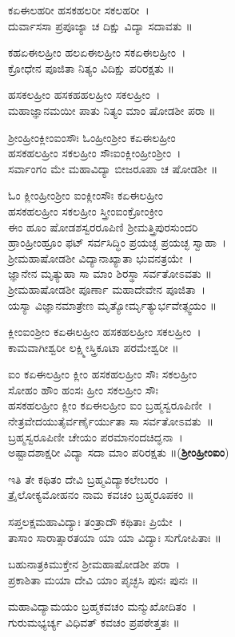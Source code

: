 ಕಏಈಲಹರೀ ಹಸಕಹಲರೀ ಸಕಲಹರೀ~।\\
ದುರ್ವಾಸಸಾ ಪ್ರಪೂಜ್ಯಾ ಚ ದಿಕ್ಷು ವಿದ್ಯಾ ಸದಾವತು ॥

ಕಹಏಈಲಹ್ರೀಂ ಹಲಏಈಲಹ್ರೀಂ ಸಕಏಈಲಹ್ರೀಂ~।\\
ಕ್ರೋಧೇನ ಪೂಜಿತಾ ನಿತ್ಯಂ ವಿದಿಕ್ಷು ಪರಿರಕ್ಷತು ॥

ಹಸಕಲಹ್ರೀಂ ಹಸಕಹಹಲಹ್ರೀಂ ಸಕಲಹ್ರೀಂ~।\\
ಮಹಾಜ್ಞಾನಮಯೀ ಪಾತು ನಿತ್ಯಂ ಮಾಂ ಷೋಡಶೀ ಪರಾ ॥

ಶ್ರೀಂಹ್ರೀಂಕ್ಲೀಂಐಂಸೌಃ ಓಂಹ್ರೀಂಶ್ರೀಂ ಕಏಈಲಹ್ರೀಂ\\ ಹಸಕಹಲಹ್ರೀಂ ಸಕಲಹ್ರೀಂ ಸೌಃಐಂಕ್ಲೀಂಹ್ರೀಂಶ್ರೀಂ~।\\
ಸರ್ವಾಂಗಂ ಮೇ ಮಹಾವಿದ್ಯಾ ಬೀಜರೂಪಾ ಚ ಷೋಡಶೀ ॥

ಓಂ ಕ್ಲೀಂಹ್ರೀಂಶ್ರೀಂ ಐಂಕ್ಲೀಂಸೌಃ ಕಏಈಲಹ್ರೀಂ\\ಹಸಕಹಲಹ್ರೀಂ ಸಕಲಹ್ರೀಂ ಸ್ತ್ರೀಂಐಂಕ್ರೋಂಕ್ರೀಂ \\ಈಂ ಹೂಂ ಷೋಡಶಸ್ವರರೂಪಿಣಿ  ಶ್ರೀಮತ್ತ್ರಿಪುರಸುಂದರಿ \\ಹ್ರಾಂಹ್ರೀಂಹ್ರೂಂ ಫಟ್ ಸರ್ವಸಿದ್ಧಿಂ ಪ್ರಯಚ್ಛ ಪ್ರಯಚ್ಛ ಸ್ವಾಹಾ~।\\
ಶ್ರೀಮಹಾಷೋಡಶೀ ವಿದ್ಯಾನಾಖ್ಯಾತಾ ಭುವನತ್ರಯೇ~।\\
ಜ್ಞಾನೇನ ಮೃತ್ಯುಹಾ ಸಾ ಮಾಂ ಶಿರಸ್ಥಾ ಸರ್ವತೋಽವತು ॥\\
ಶ್ರೀಮಹಾಷೋಡಶೀ ಪೂರ್ಣಾ ಮಹಾದೇವೇನ ಪೂಜಿತಾ~।\\
ಯಸ್ಯಾ ವಿಜ್ಞಾನಮಾತ್ರೇಣ ಮೃತ್ಯೋರ್ಮೃತ್ಯುರ್ಭವೇತ್ಸ್ವಯಂ ॥

ಕ್ಲೀಂಐಂಶ್ರೀಂ ಕಏಈಲಹ್ರೀಂ ಹಸಕಹಲಹ್ರೀಂ ಸಕಲಹ್ರೀಂ~।\\
ಕಾಮವಾಗೀಶ್ವರೀ ಲಕ್ಷ್ಮೀಸ್ತ್ರಿಕೂಟಾ ಪರಮೇಶ್ವರೀ ॥

ಐಂ ಕಏಈಲಹ್ರೀಂ ಕ್ಲೀಂ ಹಸಕಹಲಹ್ರೀಂ ಸೌಃ ಸಕಲಹ್ರೀಂ\\ಸೋಹಂ ಹೌಂ ಹಂಸಃ ಹ್ರೀಂ ಸಕಲಹ್ರೀಂ ಸೌಃ \\ ಹಸಕಹಲಹ್ರೀಂ ಕ್ಲೀಂ ಕಏಈಲಹ್ರೀಂ ಐಂ ಬ್ರಹ್ಮಸ್ವರೂಪಿಣೀ~।\\
ನೇತ್ರವೇದಯುತೈರ್ವರ್ಣೈರ್ಯುತಾ ಸಾ ಸರ್ವತೋಽವತು~॥\\
ಬ್ರಹ್ಮಸ್ವರೂಪಿಣೀ ಚೇಯಂ ಪರಮಾನಂದಚಿದ್ಘನಾ~।\\
ಅಷ್ಟಾದಶಾಕ್ಷರೀ ವಿದ್ಯಾ ಸದಾ ಮಾಂ ಪರಿರಕ್ಷತು ॥({\bfseries ಶ್ರೀಂಹ್ರೀಂಐಂ})

ಇತಿ ತೇ ಕಥಿತಂ ದೇವಿ ಬ್ರಹ್ಮವಿದ್ಯಾಕಲೇಬರಂ~।\\
ತ್ರೈಲೋಕ್ಯಮೋಹನಂ ನಾಮ ಕವಚಂ ಬ್ರಹ್ಮರೂಪಕಂ ॥

ಸಪ್ತಲಕ್ಷಮಹಾವಿದ್ಯಾಃ ತಂತ್ರಾದೌ ಕಥಿತಾಃ ಪ್ರಿಯೇ~।\\
ತಾಸಾಂ ಸಾರಾತ್ಸಾರತಯಾ ಯಾ ಯಾ ವಿದ್ಯಾಃ ಸುಗೋಪಿತಾಃ ॥

ಬಹುನಾತ್ರಕಿಮುಕ್ತೇನ ಶ್ರೀಮಹಾಷೋಡಶೀ ಪರಾ~।\\
ಪ್ರಕಾಶಿತಾ ಮಯಾ ದೇವಿ ಯಾಂ ಪೃಚ್ಛಸಿ ಪುನಃ ಪುನಃ ॥

ಮಹಾವಿದ್ಯಾಮಯಂ ಬ್ರಹ್ಮಕವಚಂ ಮನ್ಮುಖೋದಿತಂ~।\\
ಗುರುಮಭ್ಯರ್ಚ್ಯ ವಿಧಿವತ್ ಕವಚಂ ಪ್ರಪಠೇತ್ತತಃ ॥

